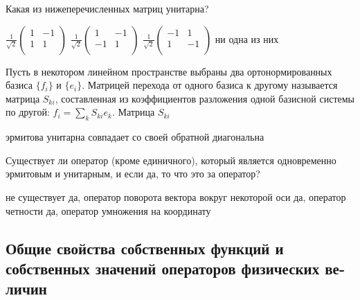 \documentclass[11pt,a4paper]{exam}
\begin{document}
\begin{questions}
\question Какая из нижеперечисленных матриц унитарна?
\begin{choices}
\choice $\frac{1}{\sqrt{2}}\left( \begin{matrix}
   1 & -1  \\
   1 & 1  \\
\end{matrix} \right)$      
\choice $\frac{1}{\sqrt{2}}\left( \begin{matrix}
   1 & -1  \\
   -1 & 1  \\
\end{matrix} \right)$      
\choice $\frac{1}{\sqrt{2}}\left( \begin{matrix}
   -1 & 1  \\
   1 & -1  \\
\end{matrix} \right)$      
\choice ни одна из них
\end{choices}

\question Пусть в некотором линейном пространстве выбраны два ортонормированных базиса $\{{{f}_{i}}\}$ и $\{{{e}_{i}}\}$. Матрицей перехода от одного базиса к другому называется матрица ${{S}_{ki}}$, составленная из коэффициентов разложения одной базисной системы по другой: ${{f}_{i}}=\sum\limits_{k}{{{S}_{ki}}{{e}_{k}}}$. Матрица ${{S}_{ki}}$
\begin{choices}
\choice эрмитова     
\choice унитарна     
\choice совпадает со своей обратной    
\choice диагональна
\end{choices}

\question Существует ли оператор (кроме единичного), который является одновременно эрмитовым и унитарным, и если да, то что это за оператор?
\begin{choices}
\choice не существует         
\choice да, оператор поворота вектора вокруг некоторой оси
\choice да, оператор четности    
\choice да, оператор умножения на координату
\end{choices}

\end{questions}


\subsection{ Общие свойства собственных функций и собственных значений операторов физических ве-личин }
\end{document}

